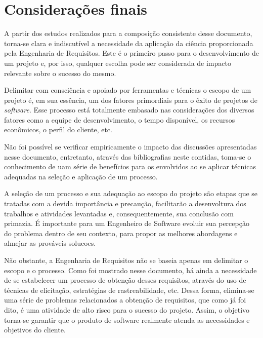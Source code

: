 \chapter[Considerações finais]{Considerações finais}

A partir dos estudos realizados para a composição consistente desse documento, torna-se clara e indiscutível a necessidade da aplicação da ciência proporcionada pela Engenharia de Requisitos. Este é o primeiro passo para o desenvolvimento de um projeto e, por isso, qualquer escolha pode ser considerada de impacto relevante sobre o sucesso do mesmo.

Delimitar com consciência e apoiado por ferramentas e técnicas o escopo de um projeto é, em sua essência, um dos fatores primordiais para o êxito de projetos de \textit{software}. Esse processo está totalmente embasado nas considerações dos diversos fatores como a equipe de desenvolvimento, o tempo disponível, os recursos econômicos, o perfil do cliente, etc.

Não foi possível se verificar empiricamente o impacto das discussões apresentadas nesse documento, entretanto, através das bibliografias neste contidas, toma-se o conhecimento de uam série de benefícios para os envolvidos ao se aplicar técnicas adequadas na seleção e aplicação de um processo.

A seleção de um processo e sua adequação ao escopo do projeto são etapas que se tratadas com a devida importância e precaução, facilitarão a desenvoltura dos trabalhos e atividades levantadas e, consequentemente, sua conclusão com primazia. É importante para um Engenheiro de Software evoluir sua percepção do problema dentro de seu contexto, para propor as melhores abordagens e almejar as prováveis solucoes.

Não obstante, a Engenharia de Requisitos não se baseia apenas em delimitar o escopo e o processo. Como foi mostrado nesse documento, há ainda a necessidade de se estabelecer um processo de obtenção desses requisitos, através do uso de técnicas de elicitação, estratégias de rastreabilidade, etc. Dessa forma, elimina-se uma série de problemas relacionados a obtenção de requisitos, que como já foi dito, é uma atividade de alto risco para o sucesso do projeto. Assim, o objetivo torna-se garantir que o produto de software realmente atenda as necessidades e objetivos do cliente.  
